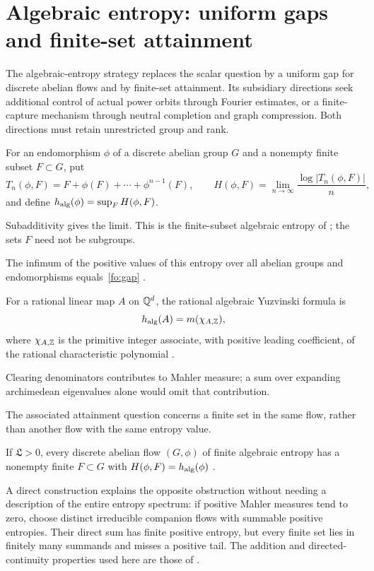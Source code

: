 \section{Algebraic entropy: uniform gaps and finite-set attainment}
\label{sec:entropy}

The algebraic-entropy strategy replaces the scalar question by a uniform gap for discrete abelian flows and by finite-set attainment.
Its subsidiary directions seek additional control of actual power orbits through Fourier estimates, or a finite-capture mechanism through neutral completion and graph compression.
Both directions must retain unrestricted group and rank.

\begin{definition}\label{fo:algebraic-entropy}
For an endomorphism $\phi$ of a discrete abelian group $G$ and a nonempty finite subset $F\subset G$, put
\[
 T_n(\phi,F)=F+\phi(F)+\cdots+\phi^{n-1}(F),\qquad
 H(\phi,F)=\lim_{n\to\infty}\frac{\log|T_n(\phi,F)|}{n},
\]
and define $h_{\rm alg}(\phi)=\sup_F H(\phi,F)$.
\end{definition}
Subadditivity gives the limit.
This is the finite-subset algebraic entropy of \citet{DGB16}; the sets $F$ need not be subgroups.

\begin{proposition}\label{fo:entropy-bridge}
The infimum of the positive values of this entropy over all abelian groups and endomorphisms equals~\eqref{fo:gap} \cite[Theorem~1.5]{DGB16}.
\end{proposition}

\begin{proposition}\label{fo:yuzvinski-formula}
For a rational linear map $A$ on $\mathbb Q^d$, the rational algebraic Yuzvinski formula is
\begin{equation}\label{fo:yuzvinski}
 h_{\rm alg}(A)=m(\chi_{A,\mathbb Z}),
\end{equation}
where $\chi_{A,\mathbb Z}$ is the primitive integer associate, with positive leading coefficient, of the rational characteristic polynomial \cite[Theorem~4.17 in the consulted preprint]{GBV15}.
\end{proposition}
Clearing denominators contributes to Mahler measure; a sum over expanding archimedean eigenvalues alone would omit that contribution.

The associated attainment question concerns a finite set in the same flow, rather than another flow with the same entropy value.
\begin{proposition}\label{fo:attainment-implication}
If $\mathfrak L>0$, every discrete abelian flow $(G,\phi)$ of finite algebraic entropy has a nonempty finite $F\subset G$ with $H(\phi,F)=h_{\rm alg}(\phi)$ \cite[Theorem~1.7]{DGB16}.
\end{proposition}
A direct construction explains the opposite obstruction without needing a description of the entire entropy spectrum: if positive Mahler measures tend to zero, choose distinct irreducible companion flows with summable positive entropies.
Their direct sum has finite positive entropy, but every finite set lies in finitely many summands and misses a positive tail.
The addition and directed-continuity properties used here are those of \citet{DGB16}.

